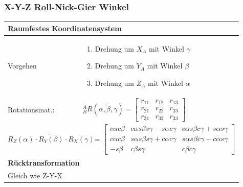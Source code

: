 \begin{minipage}{9.5cm}
    \subsubsection{X-Y-Z Roll-Nick-Gier Winkel}
   	\begin{tabular}{|p{2.5cm}|p{6cm}|}
    \hline
   
      	\multicolumn{2}{|l|}{Raumfestes Koordinatensystem}\\        	
    \hline
    Vorgehen&
    \vspace{-0.3cm}
    \begin{enumerate}
        \item Drehung um $X_A$ mit Winkel $\gamma$
        \item Drehung um $Y_A$ mit Winkel $\beta$
        \item Drehung um $Z_A$ mit Winkel $\alpha$\vspace{-0.5cm}
    \end{enumerate}\\ \hline
   		Rotationsmat.:
   		& ${^A_B}R(\overleftarrow{\alpha,\beta,\gamma}) = 
   			\begin{bmatrix} 
		    	r_{11} & r_{12} & r_{13} \\
       r_{21} & r_{22} & r_{23} \\
       r_{31} & r_{32} & r_{33}                              
   \end{bmatrix}$ \\
            \hline               
          \multicolumn{2}{|l|}{{\footnotesize 
              $ \overleftarrow{R_Z(\alpha)\cdot R_Y(\beta) \cdot R_X(\gamma)}$= $\begin{bmatrix} 
                c\alpha c\beta & c\alpha s\beta s\gamma - s\alpha c\gamma & c\alpha s\beta c\gamma + s\alpha s\gamma \\
                c\alpha c\beta & s\alpha s\beta s\gamma + c\alpha c\gamma & s\alpha s\beta c\gamma - c\alpha s\gamma \\
                -s\beta & c\beta s\gamma & c\beta c\gamma                            
            \end{bmatrix}$
        }}\\
	\hline     
       	\multicolumn{2}{|l|}{\textbf{Rücktransformation}}\\ \hline 
        \multicolumn{2}{|l|}{Gleich wie Z-Y-X} \\ \hline    
    \end{tabular}
   	\vspace{4.4cm}
\end{minipage}
    
